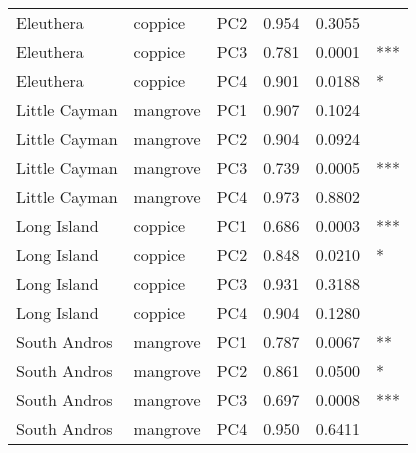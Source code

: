 \begin{tabular}{lllrrl}
Eleuthera & coppice & PC2 & 0.954 & 0.3055 & \\
Eleuthera & coppice & PC3 & 0.781 & 0.0001 & ***\\
Eleuthera & coppice & PC4 & 0.901 & 0.0188 & *\\
Little Cayman & mangrove & PC1 & 0.907 & 0.1024 & \\
Little Cayman & mangrove & PC2 & 0.904 & 0.0924 & \\
Little Cayman & mangrove & PC3 & 0.739 & 0.0005 & ***\\
Little Cayman & mangrove & PC4 & 0.973 & 0.8802 & \\
Long Island & coppice & PC1 & 0.686 & 0.0003 & ***\\
Long Island & coppice & PC2 & 0.848 & 0.0210 & *\\
Long Island & coppice & PC3 & 0.931 & 0.3188 & \\
Long Island & coppice & PC4 & 0.904 & 0.1280 & \\
South Andros & mangrove & PC1 & 0.787 & 0.0067 & **\\
South Andros & mangrove & PC2 & 0.861 & 0.0500 & *\\
South Andros & mangrove & PC3 & 0.697 & 0.0008 & ***\\
South Andros & mangrove & PC4 & 0.950 & 0.6411 & \\
\bottomrule
\end{tabular}
